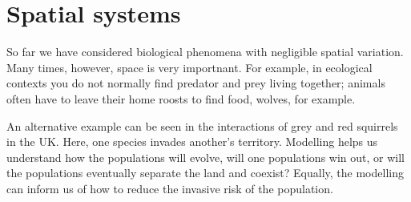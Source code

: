 \chapter{Spatial systems}\label{Spatial systems}
So far we have considered biological phenomena with negligible spatial variation. Many times, however, space is very importnant. For example, in ecological contexts you do not normally find predator and prey living together; animals often have to leave their home roosts to find food, wolves, for example.

An alternative example can be seen in the interactions of grey and red squirrels in the UK. Here, one species invades another's territory. Modelling helps us understand how the populations will evolve, \eg will one populations win out, or will the populations eventually separate the land and coexist? Equally, the modelling can inform us of how to reduce the invasive risk of the population.

